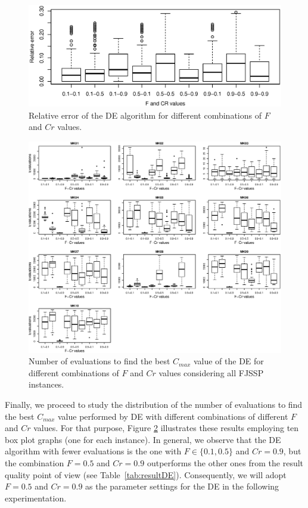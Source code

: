 \begin{figure}[!tb]
    \centering
    \includegraphics[width=\linewidth]{./figures/Boxplot-DE.eps}
    \caption{Relative error of the DE algorithm for different combinations of $F$ and $Cr$ values.}
    \label{fig:DEboxplot}
\end{figure}
%
\begin{figure}[htb]
    \centering
    \includegraphics[width=\textwidth]{./figures/DE-evalBest.eps}
    \caption{Number of evaluations to find the best $C_{max}$ value of the DE for different combinations of $F$ and $Cr$ values considering all FJSSP instances.}
    \label{fig:DEevaluations}
    \vspace{-0.4cm}
\end{figure}

Finally, we proceed to study the distribution of the number of evaluations to find the best $C_{max}$ value performed by DE with different combinations of different $F$ and $Cr$ values. For that purpose, Figure \ref{fig:DEevaluations} illustrates these results employing ten box plot graphs (one for each instance). In general, we observe that the DE algorithm with fewer evaluations is the one with $F\in \{0.1,0.5\}$ and $Cr=0.9$, but the combination $F=0.5$ and $Cr=0.9$ outperforms the other ones from the result quality point of view (see Table~\ref{tab:resultDE}). Consequently, we will adopt $F=0.5$ and $Cr=0.9$ as the parameter settings for the DE in the following experimentation. 

